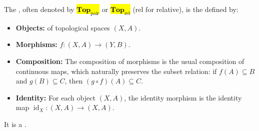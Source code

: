 \begin{definition} \label{definition:category_of_pairs_of_topological_spaces}
The , often denoted by \hl{$\mathbf{Top}_{\text{pair}}$} or \hl{$\mathbf{Top}_{\text{rel}}$} ($\text{rel}$ for relative), is the  defined by:
\begin{itemize}
    \item \textbf{Objects:}  of topological spaces $(X, A)$.
    \item \textbf{Morphisms:}  $f: (X, A) \to (Y, B)$.
    \item \textbf{Composition:} The composition of morphisms is the usual composition of continuous maps, which naturally preserves the subset relation: if $f(A) \subseteq B$ and $g(B) \subseteq C$, then $(g \circ f)(A) \subseteq C$.
    \item \textbf{Identity:} For each object $(X, A)$, the identity morphism is the identity map $\operatorname{id}_X: (X, A) \to (X, A)$.
\end{itemize}
It is a .

\end{definition}